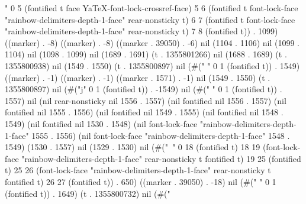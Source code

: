 " 0 5 (fontified t face YaTeX-font-lock-crossref-face) 5 6 (fontified t font-lock-face "rainbow-delimiters-depth-1-face" rear-nonsticky t) 6 7 (fontified t font-lock-face "rainbow-delimiters-depth-1-face" rear-nonsticky t) 7 8 (fontified t)) . 1099) ((marker) . -8) ((marker) . -8) ((marker . 39050) . -6) nil (1104 . 1106) nil (1099 . 1104) nil (1098 . 1099) nil (1689 . 1691) (t . 1355801266) nil (1688 . 1689) (t . 1355800938) nil (1549 . 1550) (t . 1355800897) nil (#("
" 0 1 (fontified t)) . 1549) ((marker) . -1) ((marker) . -1) ((marker . 1571) . -1) nil (1549 . 1550) (t . 1355800897) nil (#("j" 0 1 (fontified t)) . -1549) nil (#("
" 0 1 (fontified t)) . 1557) nil (nil rear-nonsticky nil 1556 . 1557) (nil fontified nil 1556 . 1557) (nil fontified nil 1555 . 1556) (nil fontified nil 1549 . 1555) (nil fontified nil 1548 . 1549) (nil fontified nil 1530 . 1548) (nil font-lock-face "rainbow-delimiters-depth-1-face" 1555 . 1556) (nil font-lock-face "rainbow-delimiters-depth-1-face" 1548 . 1549) (1530 . 1557) nil (1529 . 1530) nil (#("\
" 0 18 (fontified t) 18 19 (font-lock-face "rainbow-delimiters-depth-1-face" rear-nonsticky t fontified t) 19 25 (fontified t) 25 26 (font-lock-face "rainbow-delimiters-depth-1-face" rear-nonsticky t fontified t) 26 27 (fontified t)) . 650) ((marker . 39050) . -18) nil (#("
" 0 1 (fontified t)) . 1649) (t . 1355800732) nil (#("
